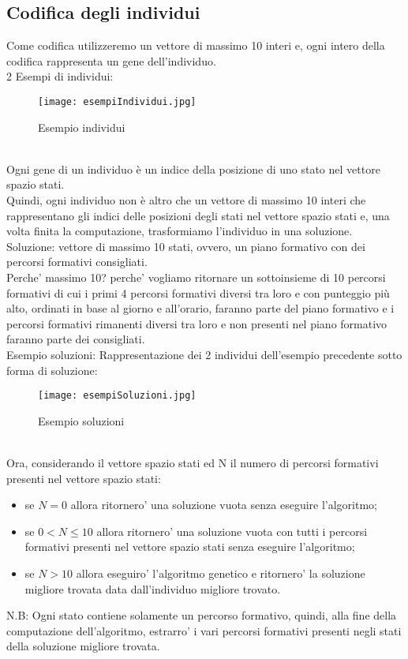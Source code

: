 \documentclass[10pt,a4paper]{article}
\begin{document}
    \subsection{Codifica degli individui}
      \label{codificaDegliIndividuiSubsection}
      Come codifica utilizzeremo un vettore di massimo 10 interi e, ogni intero della codifica rappresenta un gene dell'individuo.\\
      2 Esempi di individui:
      \begin{figure}[h!]
        \centering
        \caption{Esempio individui}
        \texttt{[image: esempiIndividui.jpg]}
        \label{esempioIndividui}
      \end{figure}\\
      Ogni gene di un individuo è un indice della posizione di uno stato nel vettore spazio stati.\\
      Quindi, ogni individuo non è altro che un vettore di massimo 10 interi che rappresentano gli indici delle posizioni degli stati 
      nel vettore spazio stati e, una volta finita la computazione, trasformiamo l'individuo in una soluzione.\\
      Soluzione: vettore di massimo 10 stati, ovvero, un piano formativo con dei percorsi formativi consigliati.\\ 
      Perche' massimo 10? perche' vogliamo ritornare un sottoinsieme di 10 percorsi formativi di cui i  primi 4 percorsi formativi diversi tra loro e con punteggio più alto, 
      ordinati in base al giorno e all'orario, faranno parte del piano formativo e i percorsi formativi rimanenti diversi tra loro e non presenti 
      nel piano formativo faranno parte dei consigliati.\\
      Esempio soluzioni:
      Rappresentazione dei 2 individui dell'esempio precedente sotto forma di soluzione:\\
      \begin{figure}[h!]
        \centering
        \caption{Esempio soluzioni}
        \texttt{[image: esempiSoluzioni.jpg]}
        \label{esempiSoluzioni}
      \end{figure}\\
      \newpage
     Ora, considerando il vettore spazio stati ed N il numero di percorsi formativi presenti nel vettore spazio stati:\\
      \begin{itemize}
        \item se $ N = 0 $ allora ritornero' una soluzione vuota senza eseguire l'algoritmo;
        \item se $ 0 < N \leq 10 $ allora ritornero' una soluzione vuota con tutti i percorsi formativi presenti nel vettore spazio stati 
        senza eseguire l'algoritmo;
        \item se $ N > 10 $ allora eseguiro' l'algoritmo genetico e ritornero' la soluzione migliore trovata data dall'individuo migliore trovato.
      \end{itemize}
      N.B: Ogni stato contiene solamente un percorso formativo, quindi, alla fine della computazione dell'algoritmo, estrarro' 
      i vari percorsi formativi presenti negli stati della soluzione migliore trovata.
     
\end{document}
